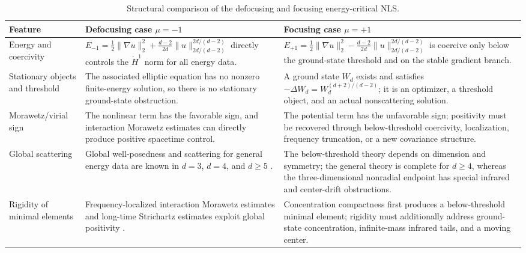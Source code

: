 \documentclass{interact}
\numberwithin{equation}{section}
\theoremstyle{plain}
\theoremstyle{definition}
\theoremstyle{remark}
\begin{document}
\begin{table}[htbp]
\centering
\caption{Structural comparison of the defocusing and focusing energy-critical NLS.}
\label{tab:focus-defocus}
\small
\setlength{\tabcolsep}{4pt}
\renewcommand{\arraystretch}{1.18}
\begin{tabularx}{\textwidth}{>{\RaggedRight\arraybackslash}p{2.2cm}>{\RaggedRight\arraybackslash}X>{\RaggedRight\arraybackslash}X}
\toprule
Feature & Defocusing case $\mu=-1$ & Focusing case $\mu=+1$ \\
\midrule
Energy and coercivity
& $E_{-1}=\frac12\|\nabla u\|_2^2+\frac{d-2}{2d}\|u\|_{2d/(d-2)}^{2d/(d-2)}$ directly controls the $\dot H^1$ norm for all energy data.
& $E_{+1}=\frac12\|\nabla u\|_2^2-\frac{d-2}{2d}\|u\|_{2d/(d-2)}^{2d/(d-2)}$ is coercive only below the ground-state threshold and on the stable gradient branch.\\
Stationary objects and threshold
& The associated elliptic equation has no nonzero finite-energy solution, so there is no stationary ground-state obstruction.
& A ground state $W_d$ exists and satisfies $-\Delta W_d=W_d^{(d+2)/(d-2)}$; it is an optimizer, a threshold object, and an actual nonscattering solution.\\
Morawetz/virial sign
& The nonlinear term has the favorable sign, and interaction Morawetz estimates can directly produce positive spacetime control.
& The potential term has the unfavorable sign; positivity must be recovered through below-threshold coercivity, localization, frequency truncation, or a new covariance structure.\\
Global scattering
& Global well-posedness and scattering for general energy data are known in $d=3$, $d=4$, and $d\ge5$ \cite{CKSTT2008,RyckmanVisan2007,Visan2007}.
& The below-threshold theory depends on dimension and symmetry; the general theory is complete for $d\ge4$, whereas the three-dimensional nonradial endpoint has special infrared and center-drift obstructions.\\
Rigidity of minimal elements
& Frequency-localized interaction Morawetz estimates and long-time Strichartz estimates exploit global positivity \cite{CKSTT2008,KillipVisan2012}.
& Concentration compactness first produces a below-threshold minimal element; rigidity must additionally address ground-state concentration, infinite-mass infrared tails, and a moving center.\\
\bottomrule
\end{tabularx}
\end{table}
\end{document}
